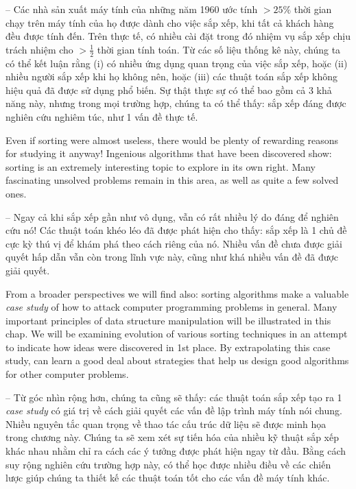 \documentclass{article}
\begin{document}
\begin{itemize}
    -- Các nhà sản xuất máy tính của những năm 1960 ước tính $> 25\%$ thời gian chạy trên máy tính của họ được dành cho việc sắp xếp, khi tất cả khách hàng đều được tính đến. Trên thực tế, có nhiều cài đặt trong đó nhiệm vụ sắp xếp chịu trách nhiệm cho $> \frac{1}{2}$ thời gian tính toán. Từ các số liệu thống kê này, chúng ta có thể kết luận rằng (i) có nhiều ứng dụng quan trọng của việc sắp xếp, hoặc (ii) nhiều người sắp xếp khi họ không nên, hoặc (iii) các thuật toán sắp xếp không hiệu quả đã được sử dụng phổ biến. Sự thật thực sự có thể bao gồm cả 3 khả năng này, nhưng trong mọi trường hợp, chúng ta có thể thấy: sắp xếp đáng được nghiên cứu nghiêm túc, như 1 vấn đề thực tế.
    
    Even if sorting were almost useless, there would be plenty of rewarding reasons for studying it anyway! Ingenious algorithms that have been discovered show: sorting is an extremely interesting topic to explore in its own right. Many fascinating unsolved problems remain in this area, as well as quite a few solved ones.
    
    -- Ngay cả khi sắp xếp gần như vô dụng, vẫn có rất nhiều lý do đáng để nghiên cứu nó! Các thuật toán khéo léo đã được phát hiện cho thấy: sắp xếp là 1 chủ đề cực kỳ thú vị để khám phá theo cách riêng của nó. Nhiều vấn đề chưa được giải quyết hấp dẫn vẫn còn trong lĩnh vực này, cũng như khá nhiều vấn đề đã được giải quyết.
    
    From a broader perspectives we will find also: sorting algorithms make a valuable {\it case study} of how to attack computer programming problems in general. Many important principles of data structure manipulation will be illustrated in this chap. We will be examining evolution of various sorting techniques in an attempt to indicate how ideas were discovered in 1st place. By extrapolating this case study, can learn a good deal about strategies that help us design good algorithms for other computer problems.
    
    -- Từ góc nhìn rộng hơn, chúng ta cũng sẽ thấy: các thuật toán sắp xếp tạo ra 1 {\it case study} có giá trị về cách giải quyết các vấn đề lập trình máy tính nói chung. Nhiều nguyên tắc quan trọng về thao tác cấu trúc dữ liệu sẽ được minh họa trong chương này. Chúng ta sẽ xem xét sự tiến hóa của nhiều kỹ thuật sắp xếp khác nhau nhằm chỉ ra cách các ý tưởng được phát hiện ngay từ đầu. Bằng cách suy rộng nghiên cứu trường hợp này, có thể học được nhiều điều về các chiến lược giúp chúng ta thiết kế các thuật toán tốt cho các vấn đề máy tính khác.
    

\end{itemize}
\end{document}
